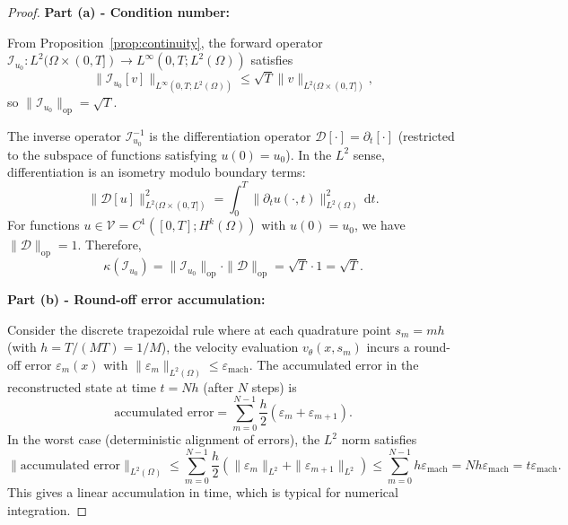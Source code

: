 \documentclass[11pt,reqno]{amsart}
\theoremstyle{plain}
\theoremstyle{definition}
\theoremstyle{remark}
\begin{document}
\begin{proof}
\textbf{Part (a) - Condition number:}

\noindent From Proposition~\ref{prop:continuity}, the forward operator $\mathcal{I}_{u_0}: L^2(\Omega \times (0,T]) \to L^\infty(0,T; L^2(\Omega))$ satisfies
\begin{equation}
    \|\mathcal{I}_{u_0}[v]\|_{L^\infty(0,T; L^2(\Omega))} \leq \sqrt{T} \|v\|_{L^2(\Omega \times (0,T])},
\end{equation}
so $\|\mathcal{I}_{u_0}\|_{\mathrm{op}} = \sqrt{T}$.

\noindent The inverse operator $\mathcal{I}_{u_0}^{-1}$ is the differentiation operator $\mathcal{D}[\cdot] = \partial_t[\cdot]$ (restricted to the subspace of functions satisfying $u(0) = u_0$). In the $L^2$ sense, differentiation is an isometry modulo boundary terms:
\begin{equation}
    \|\mathcal{D}[u]\|_{L^2(\Omega \times (0,T])}^2 = \int_0^T \|\partial_t u(\cdot,t)\|_{L^2(\Omega)}^2 \, \mathrm{d}t.
\end{equation}
For functions $u \in \mathcal{V} = C^1([0,T]; H^k(\Omega))$ with $u(0) = u_0$, we have $\|\mathcal{D}\|_{\mathrm{op}} = 1$. Therefore,
\begin{equation}
    \kappa(\mathcal{I}_{u_0}) = \|\mathcal{I}_{u_0}\|_{\mathrm{op}} \cdot \|\mathcal{D}\|_{\mathrm{op}} = \sqrt{T} \cdot 1 = \sqrt{T}.
\end{equation}

\medskip
\noindent\textbf{Part (b) - Round-off error accumulation:}

\noindent Consider the discrete trapezoidal rule where at each quadrature point $s_m = m h$ (with $h = T/(MT) = 1/M$), the velocity evaluation $v_\theta(x, s_m)$ incurs a round-off error $\varepsilon_m(x)$ with $\|\varepsilon_m\|_{L^2(\Omega)} \leq \varepsilon_{\mathrm{mach}}$. The accumulated error in the reconstructed state at time $t = Nh$ (after $N$ steps) is
\begin{equation}
    \text{accumulated error} = \sum_{m=0}^{N-1} \frac{h}{2} \left( \varepsilon_m + \varepsilon_{m+1} \right).
\end{equation}
In the worst case (deterministic alignment of errors), the $L^2$ norm satisfies
\begin{equation}
    \|\text{accumulated error}\|_{L^2(\Omega)} \leq \sum_{m=0}^{N-1} \frac{h}{2} \left( \|\varepsilon_m\|_{L^2} + \|\varepsilon_{m+1}\|_{L^2} \right) \leq \sum_{m=0}^{N-1} h \varepsilon_{\mathrm{mach}} = Nh \varepsilon_{\mathrm{mach}} = t \varepsilon_{\mathrm{mach}}.
\end{equation}
This gives a linear accumulation in time, which is typical for numerical integration.


\end{proof}
\end{document}
